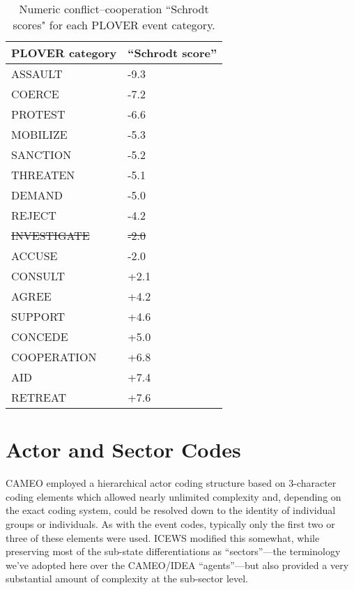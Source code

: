 \documentclass[11pt]{report}
\begin{document}
\begin{table}[htp]
\begin{center}
\begin{tabular}{ll}
\hline
\textbf{PLOVER category} & \textbf{``Schrodt score''} \\
\hline
ASSAULT  & -9.3\\
COERCE & -7.2\\
PROTEST & -6.6\\
MOBILIZE & -5.3\\
SANCTION & -5.2\\
THREATEN & -5.1\\
DEMAND & -5.0\\
REJECT & -4.2\\
\sout{INVESTIGATE} & \sout{-2.0}\\
ACCUSE &  -2.0\\
CONSULT &  +2.1\\
AGREE & +4.2\\
SUPPORT & +4.6\\
CONCEDE & +5.0\\
COOPERATION & +6.8\\
AID & +7.4\\
RETREAT & +7.6 \\
\hline
\end{tabular}
\end{center}
\label{tab:schrodtscores}
\caption{Numeric conflict--cooperation ``Schrodt scores" for each PLOVER event category.}
\end{table}




\chapter{Actor and Sector Codes}

CAMEO employed a hierarchical actor coding structure based on 3-character coding elements which allowed nearly unlimited complexity and, depending on the exact coding system, could be resolved down to the identity of individual groups or individuals. As with the event codes, typically only the first two or three of these elements were used. ICEWS modified this somewhat, while preserving most of the sub-state differentiations as ``sectors''---the terminology we've adopted here over the CAMEO/IDEA ``agents''---but also provided a very substantial amount of complexity at the sub-sector level.
\end{document}
